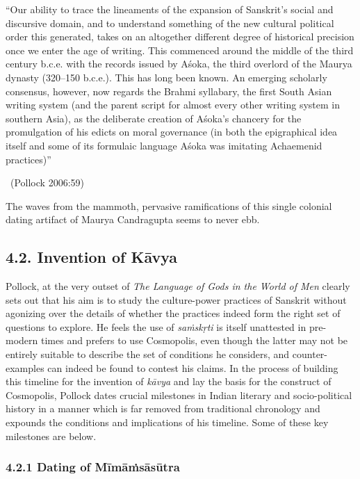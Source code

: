 \begin{myquote}
“Our ability to trace the lineaments of the expansion of Sanskrit’s social and discursive domain, and to understand something of the new cultural political order this generated, takes on an altogether different degree of historical precision once we enter the age of writing. This commenced around the middle of the third century b.c.e. with the records issued by Aśoka, the third overlord of the Maurya dynasty (320–150 b.c.e.). This has long been known. An emerging scholarly consensus, however, now regards the Brahmi syllabary, the first South Asian writing system (and the parent script for almost every other writing system in southern Asia), as the deliberate creation of Aśoka’s chancery for the promulgation of his edicts on moral governance (in both the epigraphical idea itself and some of its formulaic language Aśoka was imitating Achaemenid practices)” 

~\hfill (Pollock 2006:59)
\end{myquote}

The waves from the mammoth, pervasive ramifications of this single colonial dating artifact of Maurya Candragupta seems to never ebb.


\subsection*{4.2. Invention of Kāvya}

Pollock, at the very outset of \textit{The Language of Gods in the World of Men} clearly sets out that his aim is to study the culture-power practices of Sanskrit without agonizing over the details of whether the practices indeed form the right set of questions to explore. He feels the use of \textit{saṁskṛti} is itself unattested in pre-modern times and prefers to use Cosmopolis, even though the latter may not be entirely suitable to describe the set of conditions he considers, and counter-examples can indeed be found to contest his claims. In the process of building this timeline for the invention of \textit{kāvya} and lay the basis for the construct of Cosmopolis, Pollock dates crucial milestones in Indian literary and socio-political history in a manner which is far removed from traditional chronology and expounds the conditions and implications of his timeline. Some of these key milestones are below.

\vspace{-.4cm}

\subsubsection*{4.2.1 Dating of Mīmāṁsāsūtra}

